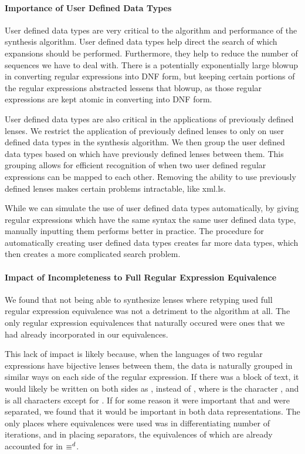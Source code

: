 \documentclass[numbers,10pt,preprint\ifanon ,nocopyrightspace\fi]{sigplanconf}
\begin{document}
\paragraph*{Importance of User Defined Data Types}

User defined data types are very critical to the algorithm and performance of
the synthesis algorithm.  User defined data types help direct the search of
which expansions should be performed.  Furthermore, they help to reduce the
number of sequences we have to deal with.  There is a potentially exponentially
large blowup in converting regular expressions into DNF form, but keeping
certain portions of the regular expressions abstracted lessens that blowup,
as those regular expressions are kept atomic in converting into DNF form.

User defined data types are also critical in the applications of previously
defined lenses.  We restrict the application of previously defined lenses to
only on user defined data types in the synthesis algorithm.  We then group the
user defined data types based on which have previously defined lenses between
them.  This grouping allows for efficient recognition of when two user defined regular
expressions can be mapped to each other.  Removing the ability to use previously
defined lenses makes certain problems intractable, like xml.ls.

While we can simulate the use of user defined data types automatically, by
giving regular expressions which have the same syntax the same user defined data
type, manually inputting them performs better in practice.  The
procedure for automatically creating user defined data types creates far more
data types, which then creates a more complicated search problem.

\paragraph*{Impact of Incompleteness to Full Regular Expression Equivalence}
We found that not being able to synthesize lenses where retyping used full
regular expression equivalence was not a detriment to the algorithm at all.  The
only regular expression equivalences that naturally occured were ones that we
had already incorporated in our equivalences.

This lack of impact is likely because, when the languages of two regular expressions have
bijective lenses between them, the data is naturally grouped in similar ways on each
side of the regular expression.  If there was a block of text, it would likely
be written on both sides as , instead of , where
 is the character , and  is all characters except for
.  If for some reason it were important that  and  were
separated, we found that it would be important in both data representations.
The only places where \StarRegexType{} equivalences were used was in
differentiating number of iterations, and in placing separators, the
equivalences of which are already accounted for in $\equiv^d$.
\end{document}
